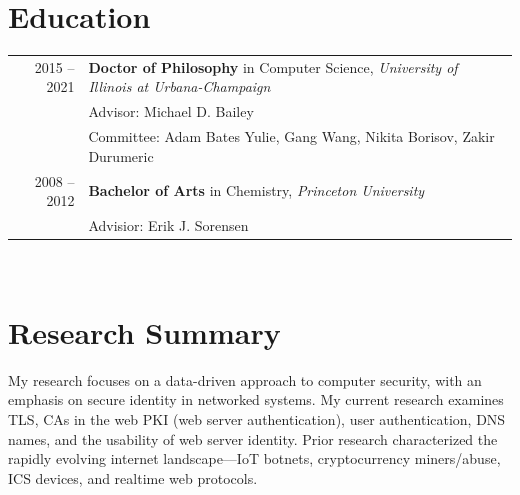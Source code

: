 \documentclass[10pt,singlecolumn]{article} %
\begin{document}

\section{Education} 

\begin{tabular}{rl} %


2015 -- 2021 & \textbf{Doctor of Philosophy} in Computer Science, \textit{University of Illinois at Urbana-Champaign}\\ 
& Advisor: Michael D. Bailey \\
& Committee: Adam Bates Yulie, Gang Wang, Nikita Borisov, Zakir Durumeric \\
	 

2008 -- 2012 & \textbf{Bachelor of Arts} in Chemistry,  \textit{Princeton University}\\
& Advisior: Erik J. Sorensen \\
	  
\end{tabular} \\

\section{Research Summary} 

My research focuses on a data-driven approach to computer security, with an emphasis on 
secure identity in networked systems. My current research examines TLS, CAs in the web PKI (web server authentication),
user authentication, DNS names, and the usability of web server identity. Prior research
characterized the rapidly evolving internet landscape---IoT botnets, cryptocurrency miners/abuse, ICS devices, 
and realtime web protocols. 

\vspace{0.2cm}
\end{document}
